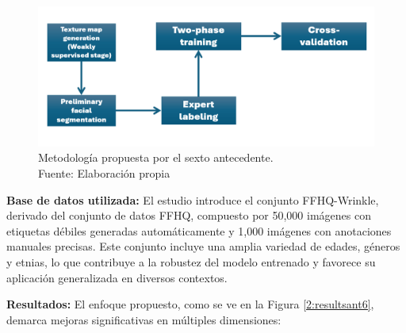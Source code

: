 \begin{figure}[H]
    \begin{center}
        \includegraphics[width=1\textwidth]{2/figures/metoant6.png}
        \caption[Metodología propuesta por el sexto antecedente]{Metodología propuesta por el sexto antecedente.\\
            Fuente: Elaboración propia}
        \label{2:figmetant6}
    \end{center}
\end{figure}

\textbf{Base de datos utilizada:}
El estudio introduce el conjunto FFHQ-Wrinkle, derivado del conjunto de datos FFHQ, compuesto por 50,000 imágenes con etiquetas débiles generadas automáticamente y 1,000 imágenes con anotaciones manuales precisas. Este conjunto incluye una amplia variedad de edades, géneros y etnias, lo que contribuye a la robustez del modelo entrenado y favorece su aplicación generalizada en diversos contextos.

\textbf{Resultados:}
El enfoque propuesto, como se ve en la Figura \ref{2:resultsant6}, demarca mejoras significativas en múltiples dimensiones:

